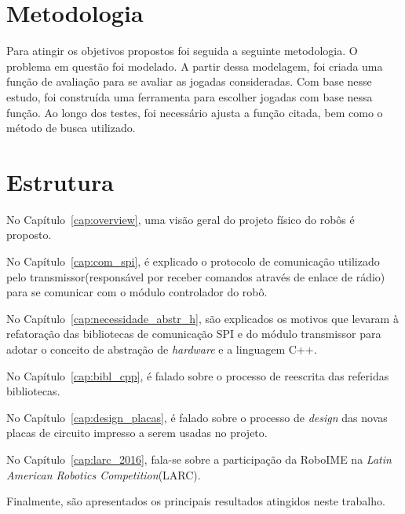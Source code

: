 \section{Metodologia}

Para atingir os objetivos propostos foi seguida a seguinte metodologia.
O problema em questão foi modelado. A partir dessa modelagem, foi
criada uma função de avaliação para se avaliar as jogadas consideradas.
Com base nesse estudo, foi construída uma ferramenta para escolher
jogadas com base nessa função. Ao longo dos testes, foi necessário
ajusta a função citada, bem como o método de busca utilizado.

\section{Estrutura}

%
%
%
%
%
%

No Capítulo~\ref{cap:overview}, uma visão geral do projeto físico do robôs é proposto.

No Capítulo~\ref{cap:com_spi}, é explicado o protocolo de comunicação utilizado pelo transmissor(responsável por receber comandos através de enlace de rádio) para se comunicar com o módulo controlador do robô.

No Capítulo~\ref{cap:necessidade_abstr_h}, são explicados os motivos que levaram à refatoração das bibliotecas de comunicação SPI e do módulo transmissor para adotar o conceito de abstração de \textit{hardware} e a linguagem C++. 

No Capítulo~\ref{cap:bibl_cpp}, é falado sobre o processo de reescrita das referidas bibliotecas.

No Capítulo~\ref{cap:design_placas}, é falado sobre o processo de \textit{design} das novas placas de circuito impresso a serem usadas no projeto.

No Capítulo~\ref{cap:larc_2016}, fala-se sobre a participação da RoboIME na \textit{Latin American Robotics Competition}(LARC).


Finalmente, são apresentados os principais resultados atingidos neste trabalho.

